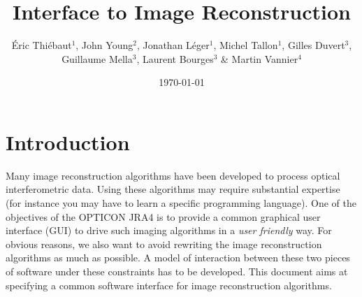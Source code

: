 \documentclass{article}
\begin{document}
\title{Interface to Image Reconstruction}

\author{Éric Thiébaut$^1$, John Young$^2$, Jonathan Léger$^1$,
  Michel Tallon$^1$, Gilles Duvert$^3$, Guillaume Mella$^3$, Laurent Bourges$^3$ \&
  Martin Vannier$^4$}



\date{\today}

\maketitle

\section{Introduction}

Many image reconstruction algorithms have been developed to process optical
interferometric data.  Using these algorithms may require substantial
expertise (for instance you may have to learn a specific programming
language). One of the objectives of the OPTICON JRA4 is to provide a common
graphical user interface (GUI) to drive such imaging algorithms in a
\emph{user friendly} way. For obvious reasons, we also want to avoid rewriting
the image reconstruction algorithms as much as possible.  A model of
interaction between these two pieces of software under these constraints has
to be developed. This document aims at specifying a common software interface
for image reconstruction algorithms.
\end{document}
